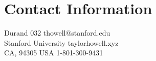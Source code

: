 \section{\sc Contact Information}
 Durand 032     \hfill thowell@stanford.edu\\
 Stanford University  \hfill taylorhowell.xyz\\
 CA, 94305 USA \hfill 1-801-300-9431

